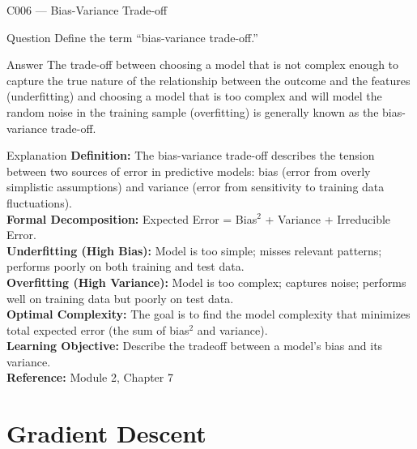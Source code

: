 \documentclass[aspectratio=169,8pt]{beamer}
\begin{document}
	\begin{frame}{C006 --- Bias-Variance Trade-off}
		\begin{block}{Question}
			Define the term ``bias-variance trade-off.''
		\end{block}
		\begin{block}{Answer}
			The trade-off between choosing a model that is not complex enough to capture the true nature of the relationship between the outcome and the features (underfitting) and choosing a model that is too complex and will model the random noise in the training sample (overfitting) is generally known as the bias-variance trade-off.
		\end{block}
		\begin{block}{Explanation}
			\textbf{Definition:} The bias-variance trade-off describes the tension between two sources of error in predictive models: bias (error from overly simplistic assumptions) and variance (error from sensitivity to training data fluctuations).\\
			\textbf{Formal Decomposition:} Expected Error = Bias$^2$ + Variance + Irreducible Error.\\
			\textbf{Underfitting (High Bias):} Model is too simple; misses relevant patterns; performs poorly on both training and test data.\\
			\textbf{Overfitting (High Variance):} Model is too complex; captures noise; performs well on training data but poorly on test data.\\
			\textbf{Optimal Complexity:} The goal is to find the model complexity that minimizes total expected error (the sum of bias$^2$ and variance).\\
			\textbf{Learning Objective:} Describe the tradeoff between a model's bias and its variance.\\
			\textbf{Reference:} Module 2, Chapter 7
		\end{block}
	\end{frame}
	
	\section{Gradient Descent}
	
\end{document}
